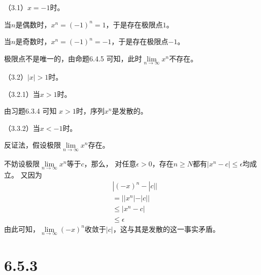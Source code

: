 \documentclass{article}
\theoremstyle{mystyle}
\begin{document}
（3.1）$x=-1$时。

当$n$是偶数时，$x^n = (-1)^n = 1$，于是存在极限点$1$。

当$n$是奇数时，$x^n = (-1)^n = -1$，于是存在极限点$-1$。

极限点不是唯一的，由命题6.4.5 可知，此时$\lim\limits_{n \rightarrow \infty}x^n$不存在。

（3.2）$|x|>1$时。

（3.2.1）当$x > 1$时。

由习题6.3.4 可知 $x > 1$时，序列$x^n$是发散的。

（3.3.2）当$x < -1$时。

反证法，假设极限$\lim\limits_{n \rightarrow \infty}x^n$存在。

不妨设极限$\lim\limits_{n \rightarrow \infty}x^n$等于$c$，那么，
对任意$\epsilon > 0$，存在$n \geq N$都有$|x^n - c| \leq \epsilon$均成立。
又因为
\begin{align*}
   & |(-x)^n - |c||  \\
   & = ||x^n| - |c|| \\
   & \leq |x^n - c|  \\
   & \leq \epsilon
\end{align*}
由此可知，$\lim\limits_{n \rightarrow \infty}(-x)^n$收敛于$|c|$，这与其是发散的这一事实矛盾。

\section*{6.5.3}
\end{document}
